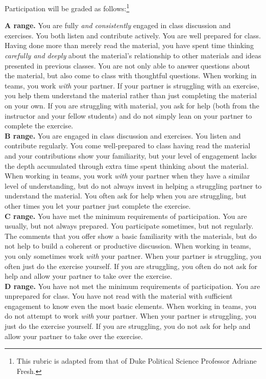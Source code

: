 \documentclass[12pt]{article}
\begin{document}
Participation will be graded as follows:\footnote{This rubric is adapted from that of Duke Political Science Professor Adriane Fresh.}

\textbf{A range.}  You are fully \emph{and consistently} engaged in class discussion and exercises.  You both listen and contribute actively.  You are well prepared for class.  Having done more than merely read the material, you have spent time thinking \emph{carefully and deeply} about the material's relationship to other materials and ideas presented in previous classes. You are not only able to answer questions about the material, but also come to class with thoughtful questions.  When working in teams, you work \emph{with} your partner. If your partner is struggling with an exercise, you help them understand the material rather than just completing the material on your own. If you are struggling with material, you ask for help (both from the instructor and your fellow students) and do not simply lean on your partner to complete the exercise. \\

\textbf{B range.}  You are engaged in class discussion and exercises.  You listen and contribute regularly.  You come well-prepared to class having read the material and your contributions show your familiarity, but your level of engagement lacks the depth accumulated through extra time spent thinking about the material.  When working in teams, you work \emph{with} your partner when they have a similar level of understanding, but do not always invest in helping a struggling partner to understand the material. You often ask for help when you are struggling, but other times you let your partner just complete the exercise. \\

\textbf{C range.}  You have met the minimum requirements of participation.  You are usually, but not always prepared.  You participate sometimes, but not regularly.  The comments that you offer show a basic familiarity with the materials, but do not help to build a coherent or productive discussion.  When working in teams, you only sometimes work \emph{with} your partner. When your partner is struggling, you often just do the exercise yourself. If you are struggling, you often do not ask for help and allow your partner to take over the exercise. \\

\textbf{D range.}  You have not met the minimum requirements of participation.  You are unprepared for class.  You have not read with the material with sufficient engagement to know even the most basic elements.  When working in teams, you do not attempt to work \emph{with} your partner. When your partner is struggling, you just do the exercise yourself. If you are struggling, you do not ask for help and allow your partner to take over the exercise.\\
\end{document}
